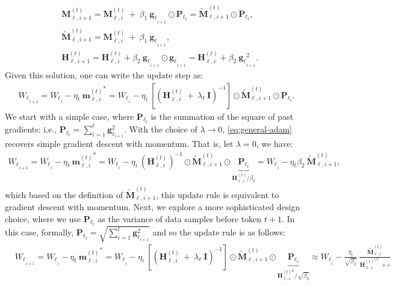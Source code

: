 \documentclass{article}
\newcommand{\undermath}[2]{\underset{#1}{\underbrace{#2}}}
\newcommand{\vg}{\boldsymbol{g}}
\newcommand{\vp}{\boldsymbol{P}}
\begin{document}
{\begin{align}
    &\boldsymbol{M}^{(t)}_{\ell, i+1} = \boldsymbol{M}^{(t)}_{\ell, i} \: + \:  \beta_1 \: {\boldsymbol{g}_{\ell}}_{_{i + 1}} \odot \vp_{\ell_{t}} = \tilde{\boldsymbol{M}}^{(t)}_{\ell, i+1} \odot \vp_{\ell_{t}},\\ \nonumber
    &\tilde{\boldsymbol{M}}^{(t)}_{\ell, i+1} = \boldsymbol{M}^{(t)}_{\ell, i} \: + \:  \beta_1 \: {\boldsymbol{g}_{\ell}}_{_{i + 1}},\\ \label{eq:solution2}
    &\boldsymbol{H}^{(t)}_{\ell, i+1} = \boldsymbol{H}^{(t)}_{\ell, i} + \beta_2 \: {\boldsymbol{g}_{\ell}}_{_{i + 1}} \odot {\boldsymbol{g}_{\ell}}_{_{i + 1}} = \boldsymbol{H}^{(t)}_{\ell, i} + \beta_2 \: {\boldsymbol{g}_{\ell}}_{_{i + 1}}^{2}.
\end{align}
Given this solution, one can write the update step as:
\begin{align}\label{eq:general-adam}
    {W_{\ell}}_{_{i+1}} = {W_{\ell}}_{_{i}} - \eta_t \: {\boldsymbol{m}^{(t)}_{\ell, i}}^{*} = {W_{\ell}}_{_{i}} - \eta_i \: \left[  \left( \boldsymbol{H}^{(t)}_{\ell, i} \: + \: \lambda_{\ell}\: \boldsymbol{I} \right)^{-1}\right] \odot \tilde{\boldsymbol{M}}^{(t)}_{\ell, i+1} \odot \vp_{\ell_{t}}. 
\end{align}
We start with a simple case, where $\vp_{\ell_{t}}$ is the summation of the square of past gradients: i.e., $\vp_{\ell_{t}} = \sum_{i = 1}^{t} \vg_{\ell_{i+1}}^2$. With the choice of $\lambda \rightarrow 0$, \autoref{eq:general-adam} recovers simple gradient descent with momentum. That is, let $\lambda = 0$, we have:
\begin{align}
    {W_{\ell}}_{_{i+1}} = {W_{\ell}}_{_{i}} - \eta_t \: {\boldsymbol{m}^{(t)}_{\ell, i}}^{*} = {W_{\ell}}_{_{i}} - \eta_i \:  \left( \boldsymbol{H}^{(t)}_{\ell, i} \right)^{-1} \odot \tilde{\boldsymbol{M}}^{(t)}_{\ell, i+1} \odot \undermath{\boldsymbol{H}^{(t)}_{\ell, i} / \beta_2}{\vp_{\ell_{t}}} = {W_{\ell}}_{_{i}} - \eta_t \beta_2 \: \tilde{\boldsymbol{M}}^{(t)}_{\ell, i+1},
\end{align}
which based on the definition of $\tilde{\boldsymbol{M}}^{(t)}_{\ell, i+1}$, this update rule is equivalent to gradient descent with momentum. Next, we explore a more sophisticated design choice, where we use $\vp_{\ell_{t}}$ as the variance of data samples before token $t + 1$. In this case, formally,  $\vp_{\ell_{t}} = \sqrt{\sum_{i = 1}^{t} \vg_{\ell_{i+1}}^2}$ and so the update rule is as follows:
\begin{align}
    &{W_{\ell}}_{_{i+1}} = {W_{\ell}}_{_{i}} - \eta_t \: {\boldsymbol{m}^{(t)}_{\ell, i}}^{*} = {W_{\ell}}_{_{i}} - \eta_i \:  \left[  \left( \boldsymbol{H}^{(t)}_{\ell, i} \: + \: \lambda_{\ell}\: \boldsymbol{I} \right)^{-1}\right] \odot \tilde{\boldsymbol{M}}^{(t)}_{\ell, i+1} \odot \undermath{\boldsymbol{H}^{(t)^{\frac{1}{2}}}_{\ell, i} / \sqrt{\beta_2}}{\vp_{\ell_{t}}} \approx {W_{\ell}}_{_{i}} - \frac{\eta_t}{\sqrt{\beta_2}} \: \frac{\tilde{\boldsymbol{M}}^{(t)}_{\ell, i}}{\boldsymbol{H}^{(t)^{1/2}}_{\ell, i} \: + \varepsilon}

\end{align}}
\end{document}
